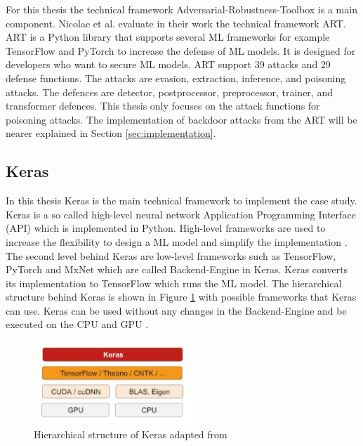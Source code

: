 For this thesis the technical framework Adversarial-Robustness-Toolbox \cite{art2018} is a main component. Nicolae et al. \cite{DBLP:journals/corr/abs-1807-01069} evaluate in their work
the technical framework ART. ART is a Python library that supports several ML frameworks for example TensorFlow and PyTorch to increase the defense of ML models. It is designed for developers who want to secure ML models. ART support 39 attacks and 29 defense functions. The attacks are evasion, extraction, inference, and poisoning attacks. The defences are detector, postprocessor, preprocessor, trainer, and transformer defences. This thesis only focuses on the attack functions for poisoning attacks. The implementation of backdoor attacks from the ART will be nearer explained in Section \ref{sec:implementation}.

\subsection{Keras}

In this thesis Keras \cite{DBLP:journals/corr/abs-2006-12138} is the main technical framework to implement the case study. Keras is a so called high-level neural network Application Programming Interface (API) which is implemented in Python. High-level frameworks are used to increase the flexibility to design a ML model and simplify the implementation \cite{moolayil_2019}. The second level behind Keras are low-level frameworks such as TensorFlow, PyTorch and MxNet which are called Backend-Engine in Keras. Keras converts its implementation to TensorFlow which runs the ML model. The hierarchical structure behind Keras is shown in Figure \ref{fig:keras_layer} with possible frameworks that Keras can use. Keras can be used without any changes in the Backend-Engine and be executed on the CPU and GPU \cite{chollet_francois_2018}.

\begin{figure}[ht!]
  \centering
  \includegraphics[width=6cm]{pictures/keras_layer.jpg}
  \caption{Hierarchical structure of Keras adapted from \cite{chollet_francois_2018}}
  \label{fig:keras_layer}
\end{figure}

